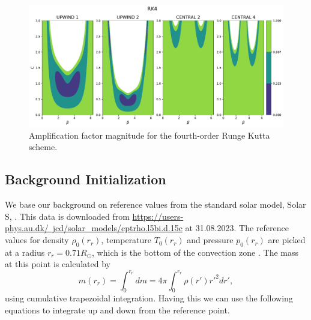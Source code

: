 \begin{figure}[htbp]
    \centering
    \includegraphics[width=0.8\linewidth]{./von_neumann_figs/vn_rk4.pdf} %
    \caption{Amplification factor magnitude for the fourth-order Runge Kutta scheme.}
    \label{fig:vn_rk4} %
\end{figure}


\subsection{Background Initialization}

We base our background on reference values from the standard solar model, Solar S, \citep{1996Sci...272.1286C}. This data is downloaded from \href{https://users-phys.au.dk/~jcd/solar_models/cptrho.l5bi.d.15c}{https://users-phys.au.dk/~jcd/solar_models/cptrho.l5bi.d.15c} at 31.08.2023. The reference values for density $\rho_0(r_r)$, temperature $T_0(r_r)$ and pressure $p_0(r_r)$ are picked at a radius $r_r=0.71R_{\odot}$, which is the bottom of the convection zone \citep{1991ApJ...378..413C}. The mass at this point is calculated by
    \begin{equation}
        m(r_r)=\int_0^{r_r} dm = 4\pi \int_0^{r_r} \rho(r')r'^2 dr',
    \end{equation}
using cumulative trapezoidal integration. Having this we can use the following equations to integrate up and down from the reference point.

